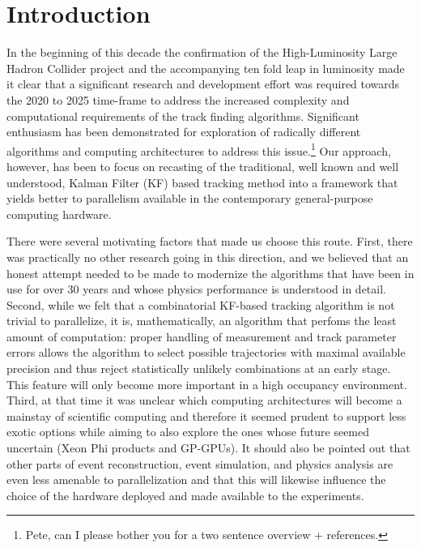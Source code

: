 \documentclass{webofc}
\begin{document}
\maketitle


\section{Introduction}

In the beginning of this decade the confirmation of the High-Luminosity Large
Hadron Collider project and the accompanying ten fold leap in luminosity made
it clear that a significant research and development effort was required
towards the 2020 to 2025 time-frame to address the increased complexity and
computational requirements of the track finding algorithms. Significant
enthusiasm has been demonstrated for exploration of radically different
algorithms and computing architectures to address this issue.\footnote{Pete,
  can I please bother you for a two sentence overview + references.} Our
approach, however, has been to focus on recasting of the traditional, well
known and well understood, Kalman Filter (KF) based tracking method into a
framework that yields better to parallelism available in the contemporary
general-purpose computing hardware.

There were several motivating factors that made us choose this route. First,
there was practically no other research going in this direction, and we
believed that an honest attempt needed to be made to modernize the algorithms
that have been in use for over 30 years and whose physics performance is
understood in detail.  Second, while we felt that a combinatorial KF-based
tracking algorithm is not trivial
to parallelize, it is, mathematically, an algorithm that perfoms the least
amount of computation: proper handling of measurement and track parameter
errors allows the algorithm to select possible trajectories with maximal
available precision and thus reject statistically unlikely combinations at an
early stage. This feature will only become more important in a high occupancy
environment. Third, at that time it was unclear which computing architectures
will become a mainstay of scientific computing and therefore it seemed prudent
to support less exotic options while aiming to also explore the ones whose
future seemed uncertain (Xeon Phi products and GP-GPUs). It should also be 
pointed out that other parts of event reconstruction, event simulation,
and physics analysis are even less amenable to parallelization and that this
will likewise influence the choice of the hardware deployed and made available
to the experiments.
\end{document}

